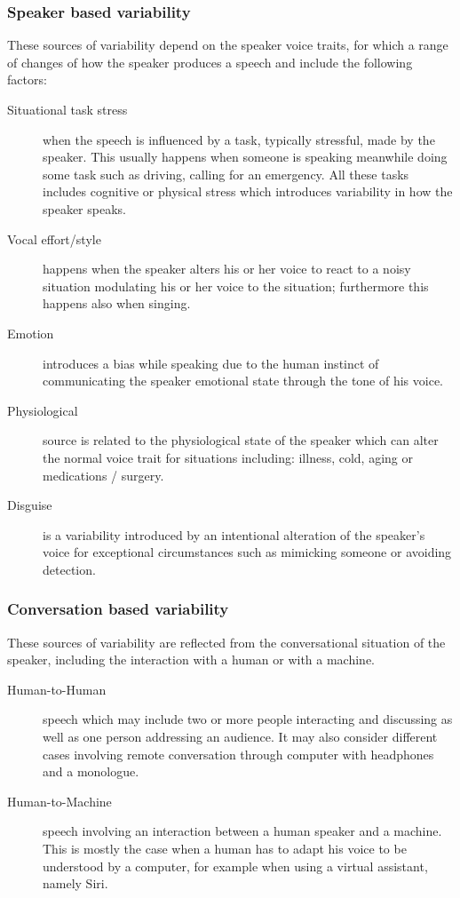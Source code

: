 \subsubsection{Speaker based variability}
These sources of variability depend on the speaker voice traits,
for which a range of changes of how the speaker produces a speech and
include the following factors:

\begin{description}
    \item[Situational task stress] when the speech is influenced by a task,
    typically stressful, made by the speaker. This usually happens when someone
    is speaking meanwhile doing some task such as driving, calling for an emergency.
    All these tasks includes cognitive or physical stress which introduces variability
    in how the speaker speaks.
    \item[Vocal effort/style] happens when the speaker alters his or her voice to react to
    a noisy situation modulating his or her voice to the situation; furthermore this happens
    also when singing.
    \item[Emotion] introduces a bias while speaking due to the human instinct of communicating
    the speaker emotional state through the tone of his voice.
    \item[Physiological] source is related to the physiological state of the speaker which
    can alter the normal voice trait for situations including: illness, cold, aging or medications / surgery.
    \item[Disguise] is a variability introduced by an intentional alteration of the speaker's voice
    for exceptional circumstances such as mimicking someone or avoiding detection.
\end{description}



\subsubsection{Conversation based variability}

These sources of variability are reflected from the conversational
situation of the speaker, including the interaction with a human
or with a machine.

\begin{description}
    \item[Human-to-Human] speech which may include two or more
    people interacting and discussing as well as one person addressing
    an audience. It may also consider different cases involving remote conversation
    through computer with headphones and a monologue.
    \item[Human-to-Machine] speech involving an interaction between a human
    speaker and a machine. This is mostly the case when a human has to adapt his
    voice to be understood by a computer, for example when using a virtual assistant, namely
    Siri.
\end{description}


